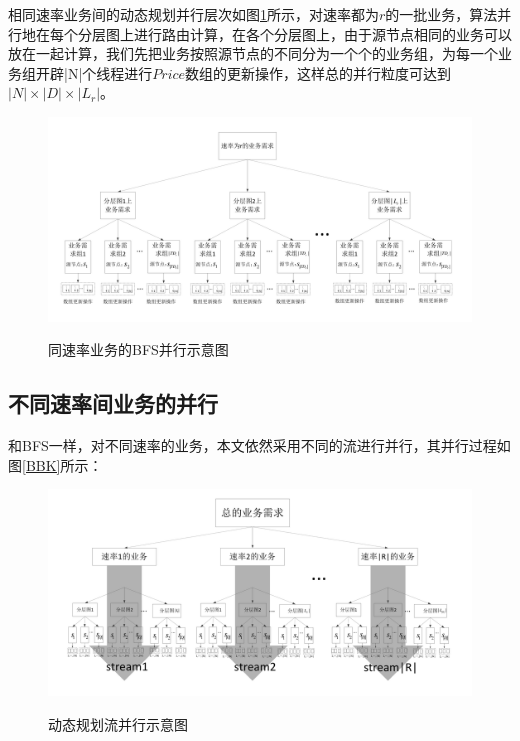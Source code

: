 相同速率业务间的动态规划并行层次如图\ref{dbs}所示，对速率都为$r$的一批业务，算法并行地在每个分层图上进行路由计算，在各个分层图上，由于源节点相同的业务可以放在一起计算，我们先把业务按照源节点的不同分为一个个的业务组，为每一个业务组开辟|N|个线程进行$Price$数组的更新操作，这样总的并行粒度可达到$|N|\times|D|\times|L_r|$。
\begin{figure}
\setlength{\belowcaptionskip}{-0.5cm}
\begin{center}
{\includegraphics[width=1 \textwidth]{figures/DRK.pdf}}
\end{center}
\caption{{\footnotesize{同速率业务的BFS并行示意图}}}
\label{dbs}
\end{figure}
\subsection{不同速率间业务的并行}
和BFS一样，对不同速率的业务，本文依然采用不同的流进行并行，其并行过程如图\ref{BBK}所示：
\begin{figure}
\setlength{\belowcaptionskip}{-0.5cm}
\begin{center}
{\includegraphics[width=1 \textwidth]{figures/BBK.pdf}}
\end{center}
\caption{{\footnotesize{动态规划流并行示意图}}}
\label{prof}
\end{figure}
